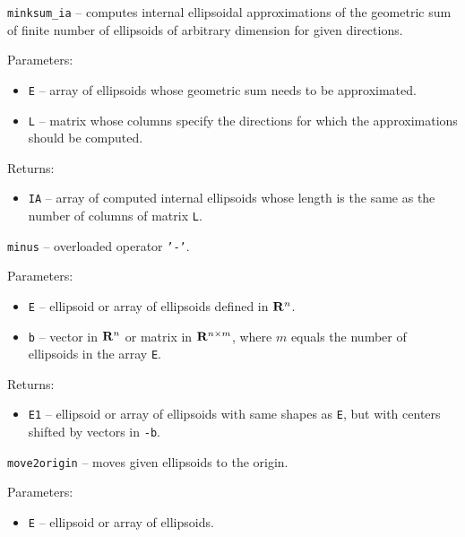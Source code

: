 

\newpage

{\Large {\tt minksum\_ia}} -- computes internal ellipsoidal approximations
of the geometric sum of finite number of ellipsoids of arbitrary dimension
for given directions.

Parameters:
\begin{itemize}
\item {\tt E} -- array of ellipsoids whose geometric sum needs to be
approximated.
\item {\tt L} -- matrix whose columns specify the directions for which
the approximations should be computed.
\end{itemize}

Returns:
\begin{itemize}
\item {\tt IA} -- array of computed internal ellipsoids whose length is the same
as the number of columns of matrix {\tt L}.
\end{itemize}



\newpage

{\Large {\tt minus}} -- overloaded operator {\tt '-'}.

Parameters:
\begin{itemize}
\item {\tt E} -- ellipsoid or array of ellipsoids defined in ${\bf R}^n$.
\item {\tt b} -- vector in ${\bf R}^n$ or matrix in ${\bf R}^{n\times m}$,
where $m$ equals the number of ellipsoids in the array {\tt E}.
\end{itemize}

Returns:
\begin{itemize}
\item {\tt E1} -- ellipsoid or array of ellipsoids with same shapes as {\tt E},
but with centers shifted by vectors in {\tt -b}.
\end{itemize}



\newpage

{\Large {\tt move2origin}} -- moves given ellipsoids to the origin.

Parameters:
\begin{itemize}
\item {\tt E} -- ellipsoid or array of ellipsoids.
\end{itemize}

